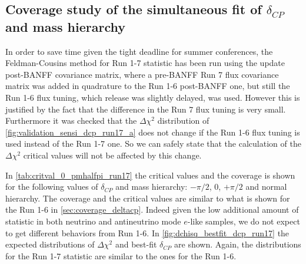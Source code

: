 \clearpage







%
% 

\subsection{Coverage study of the simultaneous fit of $\delta_{CP}$ and mass hierarchy}
\label{sec:coverage_deltacp_run17}

In order to save time given the tight deadline for summer conferences, 
the Feldman-Cousins method for Run 1-7 statistic has been run using the update post-BANFF
covariance matrix, where a pre-BANFF Run 7 flux covariance matrix was added in quadrature
to the Run 1-6 post-BANFF one, but still the Run 1-6 flux tuning, which release was slightly delayed,
was used.
However this is justified by the fact that the difference in the Run 7 flux tuning is very small.
Furthermore it was checked that the $\Delta \chi^2$ distribution of \cref{fig:validation_sensi_dcp_run17_a}
does not change if the Run 1-6 flux tuning is used instead of the Run 1-7 one.
So we can safely state that the calculation of the $\Delta \chi^2$ critical values will not be affected 
by this change.

In \cref{tab:critval_0_pmhalfpi_run17} the critical values and the coverage is shown for the following values
of $\delta_{CP}$ and mass hierarchy: $-\pi/2$, 0, $+\pi/2$ and normal hierarchy.
The coverage and the critical values are similar to what is shown for the Run 1-6 in \cref{sec:coverage_deltacp}.
Indeed given the low additional amount of statistic in both neutrino and antineutrino mode $e$-like samples,
we do not expect to get different behaviors from Run 1-6.
In \cref{fig:dchisq_bestfit_dcp_run17} the expected distributions of $\Delta \chi^2$   
and best-fit $\delta_{CP}$ are shown. Again, the distributions for the Run 1-7 statistic are similar to the ones for the Run 1-6. 
  
